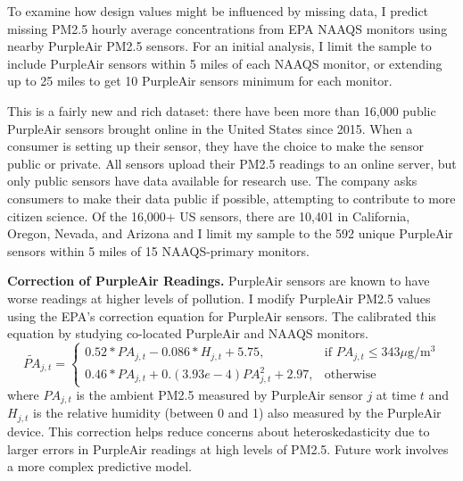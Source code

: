 \documentclass[12pt]{article}
\begin{document}
To examine how design values might be influenced by missing data, I predict missing PM2.5 hourly average concentrations from EPA NAAQS monitors using nearby PurpleAir PM2.5 sensors. For an initial analysis, I limit the sample to include PurpleAir sensors within 5 miles of each NAAQS monitor, or extending up to 25 miles to get 10 PurpleAir sensors minimum for each monitor.

This is a fairly new and rich dataset: there have been more than 16,000 public PurpleAir sensors brought online in the United States since 2015. When a consumer is setting up their sensor, they have the choice to make the sensor public or private. All sensors upload their PM2.5 readings to an online server, but only public sensors have data available for research use. The company asks consumers to make their data public if possible, attempting to contribute to more citizen science. Of the 16,000+ US sensors, there are 10,401 in California, Oregon, Nevada, and Arizona and I limit my sample to the 592 unique PurpleAir sensors within 5 miles of 15 NAAQS-primary monitors.

\textbf{Correction of PurpleAir Readings.} PurpleAir sensors are known to have worse readings at higher levels of pollution. I modify PurpleAir PM2.5 values using the EPA's correction equation for PurpleAir sensors. The calibrated this equation by studying co-located PurpleAir and NAAQS monitors.
$$
\widetilde{PA}_{j,t}=\begin{cases}
			0.52*PA_{j,t} - 0.086*H_{j,t} + 5.75, & \text{if $PA_{j,t} \leq 343 \mu$g/m$^3$}\\
            0.46*PA_{j,t} + 0.(3.93e-4)PA_{j,t}^2 + 2.97, & \text{otherwise}
		 \end{cases}
$$
where $PA_{j,t}$ is the ambient PM2.5 measured by PurpleAir sensor $j$ at time $t$ and $H_{j,t}$ is the relative humidity (between 0 and 1) also measured by the PurpleAir device. This correction helps reduce concerns about heteroskedasticity due to larger errors in PurpleAir readings at high levels of PM2.5. Future work involves a more complex predictive model.
\end{document}
